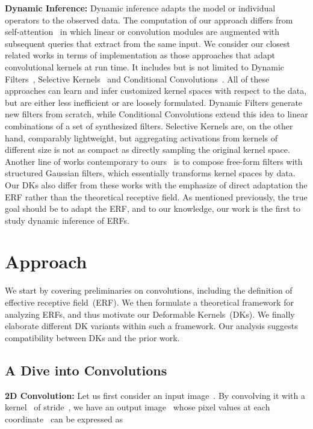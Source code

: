 \documentclass{article} \usepackage{iclr2020_conference, times}
\newcommand{\bfsection}[1]{\noindent\textbf{#1:}}
\begin{document}
\bfsection{Dynamic Inference}
Dynamic inference adapts the model or individual operators to the observed
data.
The computation of our approach differs from
self-attention~\citep{vaswani2017attention,wang2018non} in which linear or
convolution modules are augmented with subsequent queries that extract from the same
input.
We consider our closest related works in terms of implementation as
those approaches that adapt convolutional kernels at run time.
It includes but is not limited to Dynamic Filters~\citep{jia2016dynamic},
Selective Kernels~\citep{li2019selective} and Conditional
Convolutions~\citep{yang2019soft}.
All of these approaches can learn and infer customized kernel spaces with respect to the
data, but are either less inefficient or are loosely formulated.
Dynamic Filters generate new filters from scratch, while Conditional
Convolutions extend this idea to linear combinations of a set of synthesized
filters.
Selective Kernels are, on the other hand, comparably lightweight, but
aggregating activations from kernels of different size is not as compact as
directly sampling the original kernel space.
Another line of works contemporary
to ours~\citep{shelhamer2019blurring,wang2019dynamic} is to compose free-form
filters with structured Gaussian filters, which essentially transforms kernel
spaces by data.
Our DKs also differ from these works with the emphasize of direct adaptation
the ERF rather than the theoretical receptive field.
As mentioned previously, the true goal should be to adapt the ERF, and to our knowledge, our work is the first to study dynamic inference of ERFs.
 \section{Approach}

We start by covering preliminaries on convolutions, including the
definition of effective receptive field~(ERF).
We then formulate a theoretical framework for analyzing ERFs, and thus motivate
our Deformable Kernels~(DKs).
We finally elaborate different DK variants within such a framework.
Our analysis suggests compatibility between DKs and the prior work.

\subsection{A Dive into Convolutions} \label{sec:diving}

\bfsection{2D Convolution}
Let us first consider an input image~.
By convolving it with a kernel~ of stride~, we
have an output image~ whose pixel values at each coordinate~ can be expressed as
\end{document}
